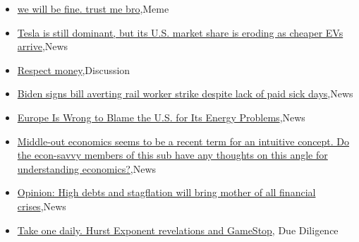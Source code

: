 \documentclass{article}%
\begin{document}
%
\begin{itemize}%
\item%
\href{https://reddit.com/r/wallstreetbets/comments/zbbqc8/we\_will\_be\_fine\_trust\_me\_bro/}{we will be fine. trust me bro},Meme%
\item%
\href{https://reddit.com/r/wallstreetbets/comments/zb8yni/tesla\_is\_still\_dominant\_but\_its\_us\_market\_share/}{Tesla is still dominant, but its U.S. market share is eroding as cheaper EVs arrive},News%
\item%
\href{https://reddit.com/r/wallstreetbets/comments/zb8wmn/respect\_money/}{Respect money},Discussion%
\item%
\href{https://reddit.com/r/Economics/comments/zb8qzb/biden\_signs\_bill\_averting\_rail\_worker\_strike/}{Biden signs bill averting rail worker strike despite lack of paid sick days},News%
\item%
\href{https://reddit.com/r/Economics/comments/zb8pct/europe\_is\_wrong\_to\_blame\_the\_us\_for\_its\_energy/}{Europe Is Wrong to Blame the U.S. for Its Energy Problems},News%
\item%
\href{https://reddit.com/r/Economics/comments/zb0u5y/middleout\_economics\_seems\_to\_be\_a\_recent\_term\_for/}{Middle-out economics seems to be a recent term for an intuitive concept. Do the econ-savvy members of this sub have any thoughts on this angle for understanding economics?},News%
\item%
\href{https://reddit.com/r/Economics/comments/zb0sus/opinion\_high\_debts\_and\_stagflation\_will\_bring/}{Opinion: High debts and stagflation will bring mother of all financial crises},News%
\item%
\href{https://reddit.com/r/Superstonk/comments/zbckkx/take\_one\_daily\_hurst\_exponent\_revelations\_and/}{Take one daily. Hurst Exponent revelations and GameStop}, Due Diligence%
\end{itemize}%
\end{document}
